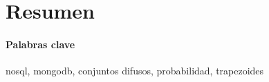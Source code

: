 \section{Resumen}


\paragraph{Palabras clave} nosql, mongodb, conjuntos difusos, probabilidad, trapezoides